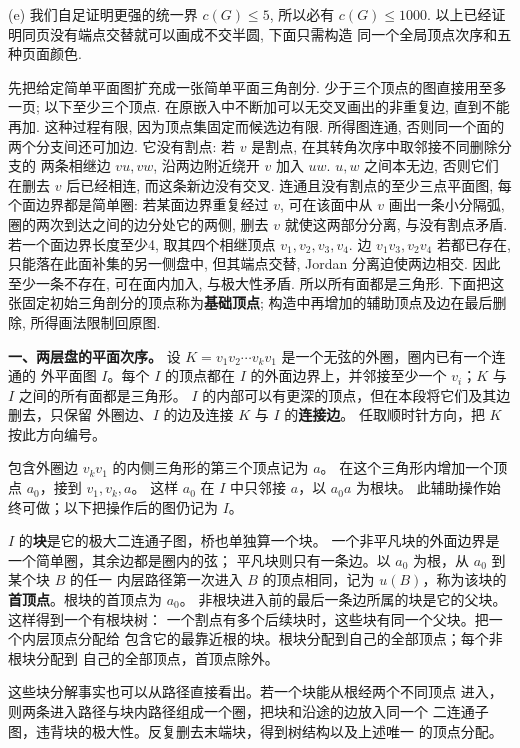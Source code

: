 \begin{solution}
(e) 我们自足证明更强的统一界 $c(G)\le5$, 所以必有 $c(G)\le1000$.
以上已经证明同页没有端点交替就可以画成不交半圆, 下面只需构造
同一个全局顶点次序和五种页面颜色.

先把给定简单平面图扩充成一张简单平面三角剖分.
少于三个顶点的图直接用至多一页; 以下至少三个顶点.
在原嵌入中不断加可以无交叉画出的非重复边, 直到不能再加.
这种过程有限, 因为顶点集固定而候选边有限.
所得图连通, 否则同一个面的两个分支间还可加边.
它没有割点: 若 $v$ 是割点, 在其转角次序中取邻接不同删除分支的
两条相继边 $vu,vw$, 沿两边附近绕开 $v$ 加入 $uw$.
$u,w$ 之间本无边, 否则它们在删去 $v$ 后已经相连, 而这条新边没有交叉.
连通且没有割点的至少三点平面图, 每个面边界都是简单圈:
若某面边界重复经过 $v$, 可在该面中从 $v$ 画出一条小分隔弧,
圈的两次到达之间的边分处它的两侧, 删去 $v$ 就使这两部分分离,
与没有割点矛盾.
若一个面边界长度至少4, 取其四个相继顶点 $v_1,v_2,v_3,v_4$.
边 $v_1v_3,v_2v_4$ 若都已存在, 只能落在此面补集的另一侧盘中,
但其端点交替, Jordan 分离迫使两边相交. 因此至少一条不存在,
可在面内加入, 与极大性矛盾. 所以所有面都是三角形.
下面把这张固定初始三角剖分的顶点称为\textbf{基础顶点};
构造中再增加的辅助顶点及边在最后删除, 所得画法限制回原图.

\medskip
\noindent\textbf{一、两层盘的平面次序。}
设 $K=v_1v_2\cdots v_kv_1$ 是一个无弦的外圈，圈内已有一个连通的
外平面图 $I$。每个 $I$ 的顶点都在 $I$ 的外面边界上，并邻接至少一个
$v_i$；$K$ 与 $I$ 之间的所有面都是三角形。
$I$ 的内部可以有更深的顶点，但在本段将它们及其边删去，只保留
外圈边、$I$ 的边及连接 $K$ 与 $I$ 的\textbf{连接边}。
任取顺时针方向，把 $K$ 按此方向编号。

包含外圈边 $v_kv_1$ 的内侧三角形的第三个顶点记为 $a$。
在这个三角形内增加一个顶点 $a_0$，接到 $v_1,v_k,a$。
这样 $a_0$ 在 $I$ 中只邻接 $a$，以 $a_0a$ 为根块。
此辅助操作始终可做；以下把操作后的图仍记为 $I$。

$I$ 的\textbf{块}是它的极大二连通子图，桥也单独算一个块。
一个非平凡块的外面边界是一个简单圈，其余边都是圈内的弦；
平凡块则只有一条边。以 $a_0$ 为根，从 $a_0$ 到某个块 $B$ 的任一
内层路径第一次进入 $B$ 的顶点相同，记为 $u(B)$，称为该块的
\textbf{首顶点}。根块的首顶点为 $a_0$。
非根块进入前的最后一条边所属的块是它的父块。这样得到一个有根块树：
一个割点有多个后续块时，这些块有同一个父块。把一个内层顶点分配给
包含它的最靠近根的块。根块分配到自己的全部顶点；每个非根块分配到
自己的全部顶点，首顶点除外。

这些块分解事实也可以从路径直接看出。若一个块能从根经两个不同顶点
进入，则两条进入路径与块内路径组成一个圈，把块和沿途的边放入同一个
二连通子图，违背块的极大性。反复删去末端块，得到树结构以及上述唯一
的顶点分配。


\end{solution}
